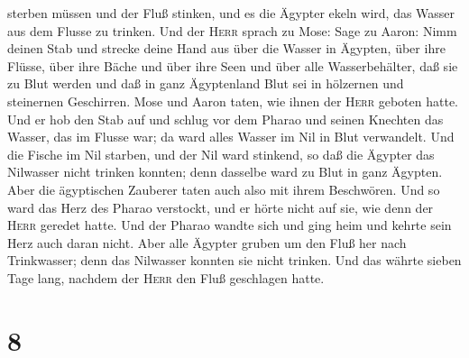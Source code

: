 sterben müssen und der Fluß stinken, und es die Ägypter ekeln wird, das
Wasser aus dem Flusse zu trinken.  Und der \textsc{Herr}
sprach zu Mose: Sage zu Aaron: Nimm deinen Stab und strecke deine Hand
aus über die Wasser in Ägypten, über ihre Flüsse, über ihre Bäche und
über ihre Seen und über alle Wasserbehälter, daß sie zu Blut werden und
daß in ganz Ägyptenland Blut sei in hölzernen und steinernen Geschirren.
 Mose und Aaron taten, wie ihnen der \textsc{Herr}
geboten hatte. Und er hob den Stab auf und schlug vor dem Pharao und
seinen Knechten das Wasser, das im Flusse war; da ward alles Wasser im
Nil in Blut verwandelt.  Und die Fische im Nil starben,
und der Nil ward stinkend, so daß die Ägypter das Nilwasser nicht
trinken konnten; denn dasselbe ward zu Blut in ganz Ägypten.
 Aber die ägyptischen Zauberer taten auch also mit ihrem
Beschwören. Und so ward das Herz des Pharao verstockt, und er hörte
nicht auf sie, wie denn der \textsc{Herr} geredet hatte. 
Und der Pharao wandte sich und ging heim und kehrte sein Herz auch daran
nicht.  Aber alle Ägypter gruben um den Fluß her nach
Trinkwasser; denn das Nilwasser konnten sie nicht trinken.
 Und das währte sieben Tage lang, nachdem der
\textsc{Herr} den Fluß geschlagen hatte.

\hypertarget{section-7}{%
\section{8}\label{section-7}}

